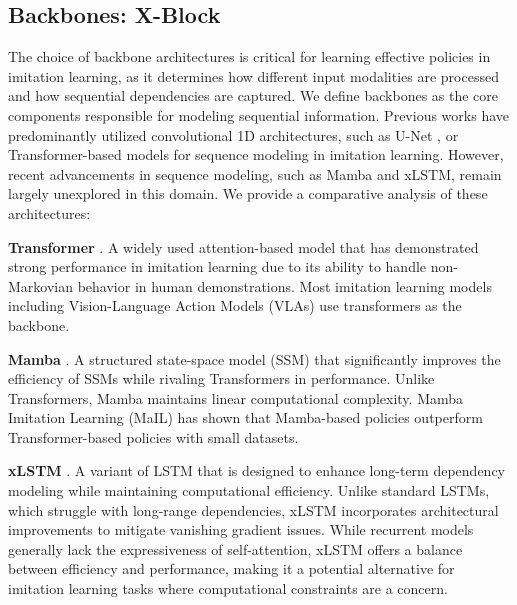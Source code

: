 

\subsection{Backbones: X-Block} \label{sec: backbones}
The choice of backbone architectures is critical for learning effective policies in imitation learning, as it determines how different input modalities are processed and how sequential dependencies are captured. We define backbones as the core components responsible for modeling sequential information. Previous works \cite{chi2023diffusion, jang2022bczzeroshottaskgeneralization, chen2021decisiontransformerreinforcementlearning, rouxel2024flowmatchingimitationlearning, shaier2022datadrivenapproachespredictingspread, bertasius2021spacetimeattentionneedvideo} have predominantly utilized convolutional 1D architectures, such as U-Net \cite{ronneberger2015unetconvolutionalnetworksbiomedical}, or Transformer-based models for sequence modeling in imitation learning. However, recent advancements in sequence modeling, such as Mamba and xLSTM, remain largely unexplored in this domain. We provide a comparative analysis of these architectures:

\textbf{Transformer} \cite{vaswani2017attention}. A widely used attention-based model that has demonstrated strong performance in imitation learning due to its ability to handle non-Markovian behavior in human demonstrations. Most imitation learning models including Vision-Language Action Models (VLAs) use transformers as the backbone.

\textbf{Mamba} \cite{gu2024mambalineartimesequencemodeling}. A structured state-space model (SSM) that significantly improves the efficiency of SSMs while rivaling Transformers in performance. Unlike Transformers, Mamba maintains linear computational complexity. Mamba Imitation Learning (MaIL) \cite{jia2024mailimprovingimitationlearning} has shown that Mamba-based policies outperform Transformer-based policies with small datasets.

\textbf{xLSTM} \cite{beck2024xlstmextendedlongshortterm}. A variant of LSTM that is designed to enhance long-term dependency modeling while maintaining computational efficiency. Unlike standard LSTMs, which struggle with long-range dependencies, xLSTM incorporates architectural improvements to mitigate vanishing gradient issues. While recurrent models generally lack the expressiveness of self-attention, xLSTM offers a balance between efficiency and performance, making it a potential alternative for imitation learning tasks where computational constraints are a concern.  

